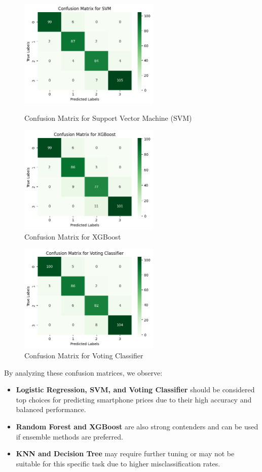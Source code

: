 \documentclass[12pt]{report}
\begin{document}
\begin{figure}[H]
    \centering
		\begin{minipage}{0.45\textwidth}
			\centering
			\includegraphics[height=14em]{cmat_SVM.png}
			\caption{Confusion Matrix for Support Vector Machine (SVM)}
			\label{cmat_SVM}
		\end{minipage}
    \hfill
    \begin{minipage}{0.45\textwidth}
        \centering
        \includegraphics[height=14em]{cmat_XG.png}
        \caption{Confusion Matrix for XGBoost}
        \label{cmat_XG}
    \end{minipage}
\end{figure}
\begin{figure}[H]
    \centering
    \includegraphics[height=14em]{cmat_VC.png}
    \caption{Confusion Matrix for Voting Classifier}
    \label{cmat_VC}
\end{figure}

\noindent By analyzing these confusion matrices, we observe:
\vspace{-1.25em}
\begin{itemize}
	\setlength\itemsep{-1.05em}
	\item \textbf{Logistic Regression, SVM, and Voting Classifier} should be considered top choices for predicting smartphone prices due to their high accuracy and balanced performance.
	\item \textbf{Random Forest and XGBoost} are also strong contenders and can be used if ensemble methods are preferred.
	\item \textbf{KNN and Decision Tree} may require further tuning or may not be suitable for this specific task due to higher misclassification rates.
\end{itemize}
\end{document}
